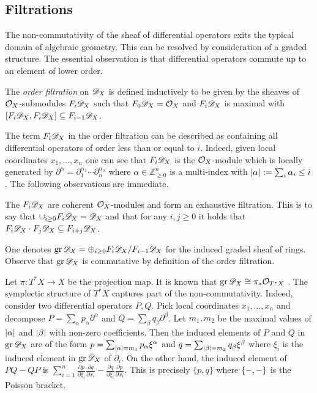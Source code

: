 \subsection{Filtrations}
The non-commutativity of the sheaf of differential operators exits the typical domain of algebraic geometry.
This can be resolved by consideration of a graded structure.
The essential observation is that differential operators commute up to an element of lower order.
\begin{definition}
  The {\it order filtration} on $\mathscr{D}_X$ is defined inductively to be given by the sheaves of $\mathcal{O}_X$-submodules $F_i \mathscr{D}_X$ such that $F_0\mathscr{D}_X = \mathcal{O}_X$ and $F_i\mathscr{D}_X$ is maximal with $[F_i\mathscr{D}_X, F_i \mathscr{D}_X] \subseteq F_{i-1}\mathscr{D}_X$.
\end{definition}
The term $F_i \mathscr{D}_X$ in the order filtration can be described as containing all differential operators of order less than or equal to $i$.
Indeed, given local coordinates $x_1,\ldots, x_n$ one can see that $F_i\mathscr{D}_X$ is the $\mathcal{O}_X$-module which is locally generated by $\partial^\alpha = \partial_1^{\alpha_1}\cdots \partial_n^{\alpha_n}$ where $\alpha\in \mathbb{Z}_{\geq 0}^n$ is a multi-index with $\vert \alpha \vert := \sum_{i}\alpha_i\leq i$.
The following observations are immediate.
\begin{lemma}
  The $F_i\mathscr{D}_X$ are coherent $\mathcal{O}_X$-modules and form an exhaustive filtration. This is to say that $\cup_{i\geq 0}F_i\mathscr{D}_X = \mathscr{D}_X$
  and that for any $i,j\geq 0$ it holds that $F_i\mathscr{D}_X \cdot F_j \mathscr{D}_X \subseteq F_{i+j}\mathscr{D}_X$.
\end{lemma}
One denotes $\operatorname{gr} \mathscr{D}_X = \oplus_{i\geq 0}F_i\mathscr{D}_X/F_{i-1}\mathscr{D}_X$ for the induced graded sheaf of rings.
Observe that $\operatorname{gr}\mathscr{D}_X$ is commutative by definition of the order filtration.

Let $\pi:T^*X \to X$ be the projection map.
It is known that $\operatorname{gr}\mathscr{D}_X \cong \pi_*\mathcal{O}_{T^*X}$ \cite[Section 2.1]{hotta2007d}.
The symplectic structure of $T^* X$ captures part of the non-commutativity.
Indeed, consider two differential operators $P, Q$.
Pick local coordinates $x_1,\ldots, x_n$ and decompose $P = \sum_{\alpha} p_\alpha \partial^\alpha $ and $Q = \sum_{\beta} q_\beta \partial^\beta$.
Let $m_1,m_2$ be the maximal values of $\vert \alpha \vert$ and $\vert \beta \vert$ with non-zero coefficients.
Then the induced elements of $P$ and $Q$ in $\operatorname{gr} \mathscr{D}_X$ are of the form $p = \sum_{\vert \alpha \vert = m_1} p_\alpha \xi^\alpha$ and $q = \sum_{\vert \beta \vert = m_2}q_\beta \xi^\beta $ where $\xi_i$ is the induced element in $\operatorname{gr}\mathscr{D}_X$ of $\partial_i$.
On the other hand, the induced element of $PQ - QP$ is $\sum_{i=1}^n\frac{\partial p}{\partial \xi_i}\frac{\partial q}{\partial x_i} - \frac{\partial q}{\partial \xi_i}\frac{\partial p}{\partial x_i}$.
This is precisely $\{p,q\}$ where $\{{-},{-}\}$ is the Poisson bracket.


